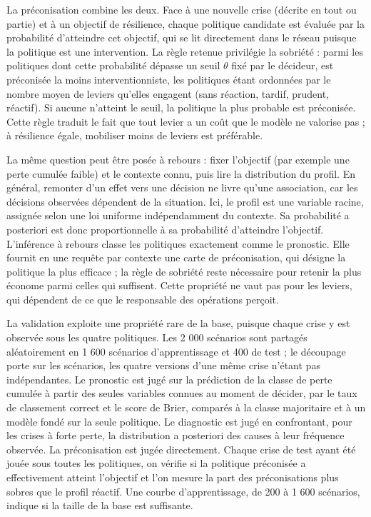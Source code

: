 La préconisation combine les deux. Face à une nouvelle crise (décrite en tout ou partie) et à un objectif de résilience, chaque politique candidate est évaluée par la probabilité d'atteindre cet objectif, qui se lit directement dans le réseau puisque la politique est une intervention. La règle retenue privilégie la sobriété : parmi les politiques dont cette probabilité dépasse un seuil $\theta$ fixé par le décideur, est préconisée la moins interventionniste, les politiques étant ordonnées par le nombre moyen de leviers qu'elles engagent (sans réaction, tardif, prudent, réactif). Si aucune n'atteint le seuil, la politique la plus probable est préconisée. Cette règle traduit le fait que tout levier a un coût que le modèle ne valorise pas ; à résilience égale, mobiliser moins de leviers est préférable.

La même question peut être posée à rebours : fixer l'objectif (par exemple une perte cumulée faible) et le contexte connu, puis lire la distribution du profil. En général, remonter d'un effet vers une décision ne livre qu'une association, car les décisions observées dépendent de la situation. Ici, le profil est une variable racine, assignée selon une loi uniforme indépendamment du contexte. Sa probabilité a posteriori est donc proportionnelle à sa probabilité d'atteindre l'objectif. L'inférence à rebours classe les politiques exactement comme le pronostic. Elle fournit en une requête par contexte une carte de préconisation, qui désigne la politique la plus efficace ; la règle de sobriété reste nécessaire pour retenir la plus économe parmi celles qui suffisent. Cette propriété ne vaut pas pour les leviers, qui dépendent de ce que le responsable des opérations perçoit.

La validation exploite une propriété rare de la base, puisque chaque crise y est observée sous les quatre politiques. Les 2 000 scénarios sont partagés aléatoirement en 1 600 scénarios d'apprentissage et 400 de test ; le découpage porte sur les scénarios, les quatre versions d'une même crise n'étant pas indépendantes. Le pronostic est jugé sur la prédiction de la classe de perte cumulée à partir des seules variables connues au moment de décider, par le taux de classement correct et le score de Brier, comparés à la classe majoritaire et à un modèle fondé sur la seule politique. Le diagnostic est jugé en confrontant, pour les crises à forte perte, la distribution a posteriori des causes à leur fréquence observée. La préconisation est jugée directement. Chaque crise de test ayant été jouée sous toutes les politiques, on vérifie si la politique préconisée a effectivement atteint l'objectif et l'on mesure la part des préconisations plus sobres que le profil réactif. Une courbe d'apprentissage, de 200 à 1 600 scénarios, indique si la taille de la base est suffisante.
